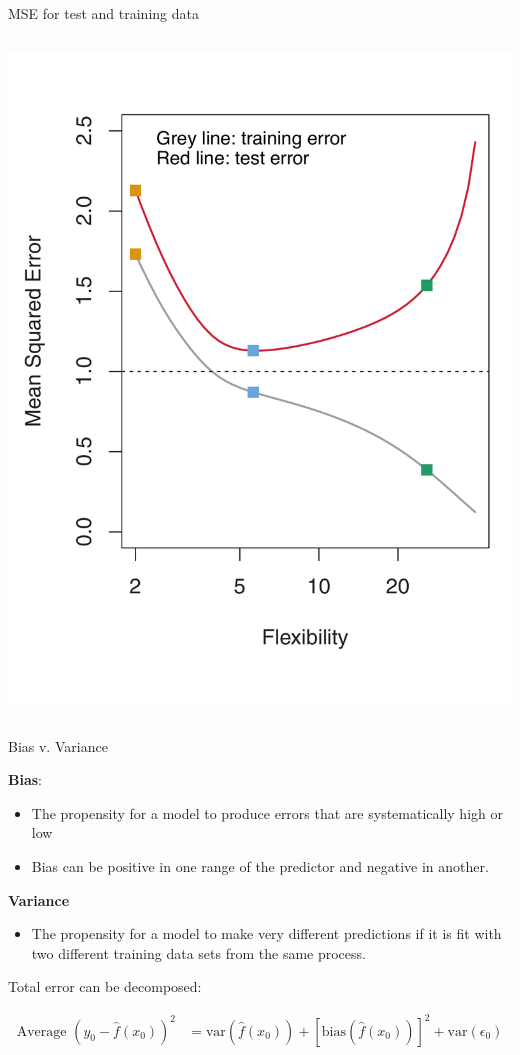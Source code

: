 \documentclass[aspectratio=169]{beamer}
\begin{document}
\begin{frame}{MSE for test and training data}
\begin{columns}
\pause 
\includegraphics[scale=0.25]{figures/islr2_9b.pdf}
\end{columns}


\end{frame}


\begin{frame}{Bias v. Variance}

\textbf{Bias}: 
\begin{itemize}
\item The propensity for a model to produce errors that are systematically high or low
\item Bias can be positive in one range of the predictor and negative in another.  
\end{itemize}


\textbf{Variance}
\begin{itemize}
\item The propensity for a model to make very different predictions if it is fit with two different training data sets from the same process.
\end{itemize}

\hspace{5mm}

Total error can be decomposed:

\begin{align*}
\text{Average }(y_0-\hat{f}(x_0))^2 &=  \text{var} (\hat{f}(x_0)) + [\text{bias}(\hat{f}(x_0))]^2+\text{var}(\epsilon_0)
\end{align*}

\end{frame}
\end{document}
